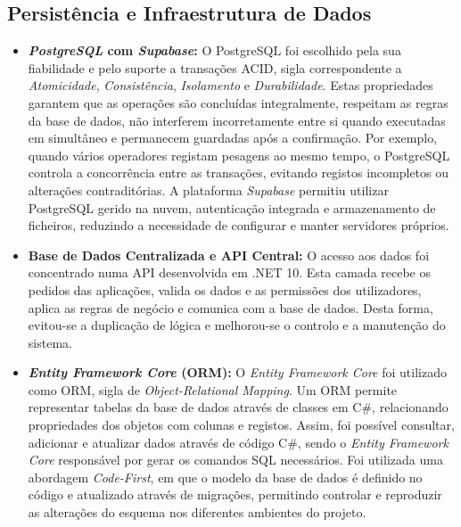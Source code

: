\subsection{Persistência e Infraestrutura de Dados}
\begin{itemize}
    \item \textbf{\textit{PostgreSQL} com \textit{Supabase}:} O PostgreSQL foi escolhido pela sua fiabilidade e pelo suporte a transações ACID, sigla correspondente a \textit{Atomicidade}, \textit{Consistência}, \textit{Isolamento} e \textit{Durabilidade}. Estas propriedades garantem que as operações são concluídas integralmente, respeitam as regras da base de dados, não interferem incorretamente entre si quando executadas em simultâneo e permanecem guardadas após a confirmação. Por exemplo, quando vários operadores registam pesagens ao mesmo tempo, o PostgreSQL controla a concorrência entre as transações, evitando registos incompletos ou alterações contraditórias. A plataforma \textit{Supabase} permitiu utilizar PostgreSQL gerido na nuvem, autenticação integrada e armazenamento de ficheiros, reduzindo a necessidade de configurar e manter servidores próprios.
    \item \textbf{Base de Dados Centralizada e \ac{API} Central:} O acesso aos dados foi concentrado numa \ac{API} desenvolvida em .NET 10. Esta camada recebe os pedidos das aplicações, valida os dados e as permissões dos utilizadores, aplica as regras de negócio e comunica com a base de dados. Desta forma, evitou-se a duplicação de lógica e melhorou-se o controlo e a manutenção do sistema.
    \item \textbf{\textit{Entity Framework Core} (\ac{ORM}):} O \textit{Entity Framework Core} foi utilizado como \ac{ORM}, sigla de \textit{Object-Relational Mapping}. Um ORM permite representar tabelas da base de dados através de classes em C\#, relacionando propriedades dos objetos com colunas e registos. Assim, foi possível consultar, adicionar e atualizar dados através de código C\#, sendo o \textit{Entity Framework Core} responsável por gerar os comandos SQL necessários. Foi utilizada uma abordagem \textit{Code-First}, em que o modelo da base de dados é definido no código e atualizado através de migrações, permitindo controlar e reproduzir as alterações do esquema nos diferentes ambientes do projeto.
\end{itemize}

